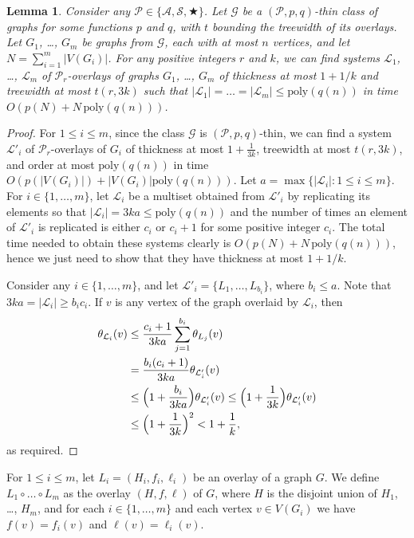 \documentclass[a4paper,11pt]{article}
\newcommand{\Aa}{{\mathcal A}}
\newcommand{\GG}{{\mathcal G}}
\newcommand{\LL}{{\mathcal L}}
\newcommand{\Ss}{{\mathcal S}}
\newcommand{\PP}{{\mathcal P}}
\newcommand{\poly}{\text{poly}}
\newtheorem{lemma}[theorem]{Lemma}
\begin{document}
\begin{lemma}\label{lemma-samesize}
Consider any $\PP\in\{\Aa,\Ss,\bigstar\}$.
Let $\GG$ be a $(\PP,p,q)$-thin class of graphs for some functions $p$ and $q$, with $t$ bounding the treewidth of its overlays.
Let $G_1$, \ldots, $G_m$ be graphs from $\GG$,
each with at most $n$ vertices, and let $N=\sum_{i=1}^m |V(G_i)|$.
For any positive integers $r$ and $k$, we can find systems $\LL_1$, \ldots, $\LL_m$ of $\PP_r$-overlays of graphs $G_1$, \ldots, $G_m$ of
thickness at most $1+1/k$ and treewidth at most $t(r,3k)$ such that $|\LL_1|=\ldots=|\LL_m|\le \poly(q(n))$
in time $O(p(N)+N\,\poly(q(n)))$.
\end{lemma}
\begin{proof}
For $1\le i\le m$, since the class $\GG$ is $(\PP,p,q)$-thin, we can find a system $\LL'_i$ of $\PP_r$-overlays of $G_i$ of thickness at most $1+\frac{1}{3k}$,
treewidth at most $t(r,3k)$, and order at most $\poly(q(n))$ in time $O(p(|V(G_i)|)+|V(G_i)|\poly(q(n)))$.
Let $a=\max\{|\LL_i|:1\le i\le m\}$.
For $i\in\{1,\ldots,m\}$, let $\LL_i$ be a multiset obtained from $\LL'_i$ by replicating its elements
so that $|\LL_i|=3ka\le \poly(q(n))$ and the number of times an element of $\LL'_i$ is replicated is either $c_i$ or $c_i+1$
for some positive integer $c_i$.  The total time needed to obtain these systems clearly is $O(p(N)+N\,\poly(q(n)))$,
hence we just need to show that they have thickness at most $1+1/k$.

Consider any $i\in\{1,\ldots, m\}$, and let $\LL'_i=\{L_1,\ldots,L_{b_i}\}$, where $b_i\le a$.  Note that $3ka=|\LL_i|\ge b_ic_i$.  If $v$ is any vertex of the graph overlaid by $\LL_i$, then
\begin{align*}
\theta_{\LL_i}(v)&\le\frac{c_i+1}{3ka}\sum_{j=1}^{b_i} \theta_{L_j}(v)\\
&=\frac{b_i(c_i+1)}{3ka}\theta_{\LL'_i}(v)\\
&\le \Bigl(1+\frac{b_i}{3ka}\Bigr)\theta_{\LL'_i}(v)\le \Bigl(1+\frac{1}{3k}\Bigr)\theta_{\LL'_i}(v)\\
&\le \Bigl(1+\frac{1}{3k}\Bigr)^2<1+\frac{1}{k},
\end{align*}
as required.
\end{proof}

For $1\le i\le m$, let $L_i=(H_i,f_i,\ell_i)$ be an overlay of a graph $G$.
We define $L_1\circ\ldots\circ L_m$ as the overlay $(H,f,\ell)$ of $G$, where $H$ is the disjoint union of
$H_1$, \ldots, $H_m$, and for each $i\in\{1,\ldots,m\}$ and each vertex $v\in V(G_i)$ we have
$f(v)=f_i(v)$ and $\ell(v)=\ell_i(v)$.
\end{document}

